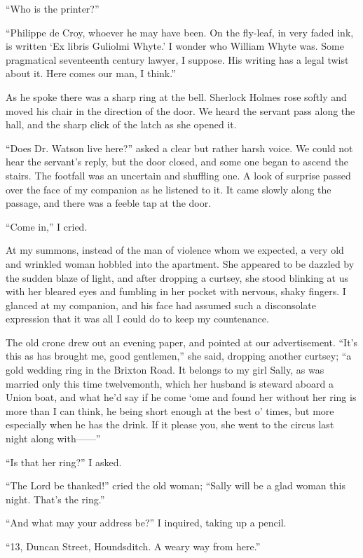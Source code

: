 \documentclass[12pt]{book}
\begin{document}
“Who is the printer?” 

“Philippe de Croy, whoever he may have been. On the fly-leaf, in very faded ink, is written ‘Ex libris Guliolmi Whyte.’ I wonder who William Whyte was. Some pragmatical seventeenth century lawyer, I suppose. His writing has a legal twist about it. Here comes our man, I think.” 

As he spoke there was a sharp ring at the bell. Sherlock Holmes rose softly and moved his chair in the direction of the door. We heard the servant pass along the hall, and the sharp click of the latch as she opened it. 

“Does Dr. Watson live here?” asked a clear but rather harsh voice. We could not hear the servant’s reply, but the door closed, and some one began to ascend the stairs. The footfall was an uncertain and shuffling one. A look of surprise passed over the face of my companion as he listened to it. It came slowly along the passage, and there was a feeble tap at the door. 

“Come in,” I cried. 

At my summons, instead of the man of violence whom we expected, a very old and wrinkled woman hobbled into the apartment. She appeared to be dazzled by the sudden blaze of light, and after dropping a curtsey, she stood blinking at us with her bleared eyes and fumbling in her pocket with nervous, shaky fingers. I glanced at my companion, and his face had assumed such a disconsolate expression that it was all I could do to keep my countenance. 

The old crone drew out an evening paper, and pointed at our advertisement. “It’s this as has brought me, good gentlemen,” she said, dropping another curtsey; “a gold wedding ring in the Brixton Road. It belongs to my girl Sally, as was married only this time twelvemonth, which her husband is steward aboard a Union boat, and what he’d say if he come ‘ome and found her without her ring is more than I can think, he being short enough at the best o’ times, but more especially when he has the drink. If it please you, she went to the circus last night along with——” 

“Is that her ring?” I asked. 

“The Lord be thanked!” cried the old woman; “Sally will be a glad woman this night. That’s the ring.” 

“And what may your address be?” I inquired, taking up a pencil. 

“13, Duncan Street, Houndsditch. A weary way from here.” 
\end{document}
